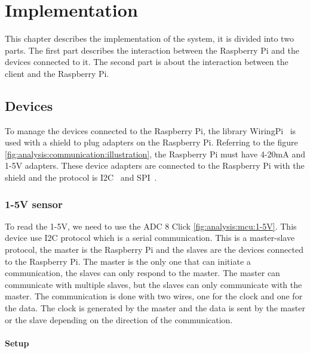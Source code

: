 \chapter{Implementation}
\label{ch:implementation}

This chapter describes the implementation of the system, it is divided into two parts.
The first part describes the interaction between the Raspberry Pi and the devices connected to it.
The second part is about the interaction between the client and the Raspberry Pi.

\section{Devices}
\label{ch:implementation:sec:devices}

To manage the devices connected to the Raspberry Pi, the library WiringPi~\cite{WiringPi} is used with a shield to plug adapters on the Raspberry Pi.
Referring to the figure \ref{fig:analysis:communication:illustration}, the Raspberry Pi must have 4-20mA and 1-5V adapters.
These device adapters are connected to the Raspberry Pi with the shield and the protocol is I2C~\cite{i2c} and SPI~\cite{spi}.

\subsection{1-5V sensor}
\label{ch:implementation:sec:devices:subsec:i2c}

To read the 1-5V, we need to use the ADC 8 Click \ref{fig:analysis:mcu:1-5V}.
This device use I2C protocol which is a serial communication.
This is a master-slave protocol, the master is the Raspberry Pi and the slaves are the devices connected to the Raspberry Pi.
The master is the only one that can initiate a communication, the slaves can only respond to the master.
The master can communicate with multiple slaves, but the slaves can only communicate with the master.
The communication is done with two wires, one for the clock and one for the data.
The clock is generated by the master and the data is sent by the master or the slave depending on the direction of the communication.

\subsubsection{Setup}
\label{ch:implementation:sec:devices:subsec:1-5V:setup}


